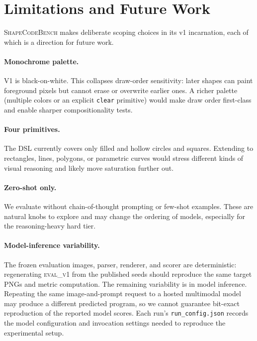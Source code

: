 \section{Limitations and Future Work}
\label{sec:limitations}

\textsc{ShapeCodeBench} makes deliberate scoping choices in its v1 incarnation, each
of which is a direction for future work.

\paragraph{Monochrome palette.}
V1 is black-on-white. This collapses draw-order sensitivity: later shapes can
paint foreground pixels but cannot erase or overwrite earlier ones. A richer
palette (multiple colors or an explicit \texttt{clear} primitive) would make
draw order first-class and enable sharper compositionality tests.

\paragraph{Four primitives.}
The DSL currently covers only filled and hollow circles and squares. Extending
to rectangles, lines, polygons, or parametric curves would stress different
kinds of visual reasoning and likely move saturation further out.

\paragraph{Zero-shot only.}
We evaluate without chain-of-thought prompting or few-shot examples. These are
natural knobs to explore and may change the ordering of models, especially for
the reasoning-heavy hard tier.

\paragraph{Model-inference variability.}
The frozen evaluation images, parser, renderer, and scorer are deterministic:
regenerating \textsc{eval\_v1} from the published seeds should reproduce the
same target PNGs and metric computation. The remaining variability is in model
inference. Repeating the same image-and-prompt request to a hosted multimodal
model may produce a different predicted program, so we cannot guarantee
bit-exact reproduction of the reported model scores. Each run's
\texttt{run\_config.json} records the model configuration and invocation settings
needed to reproduce the experimental setup.

